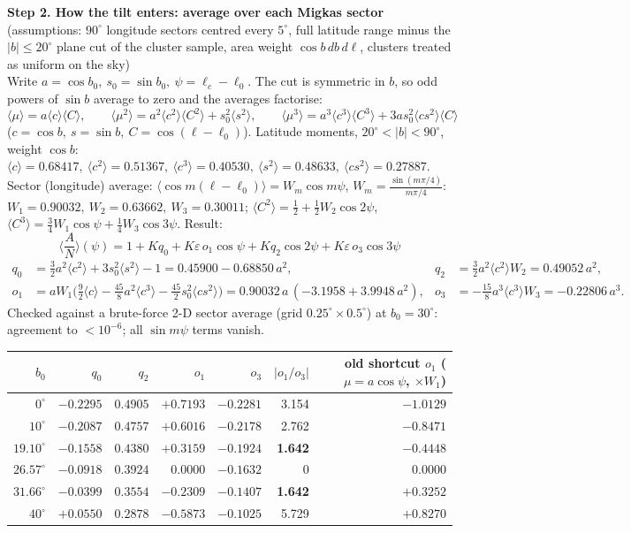 \documentclass[11pt]{article}
\begin{document}
\medskip\textbf{Step 2. How the tilt enters: average over each Migkas sector} (assumptions: $90^\circ$ longitude sectors centred every $5^\circ$,
full latitude range minus the $|b|\le20^\circ$ plane cut of the cluster sample, area weight $\cos b\,db\,d\ell$, clusters treated as uniform on the sky)\\[2pt]
Write $a=\cos b_0,\ s_0=\sin b_0,\ \psi=\ell_c-\ell_0$. The cut is symmetric in $b$, so odd powers of $\sin b$ average to zero and the averages factorise:
\[
\langle\mu\rangle=a\langle c\rangle\langle C\rangle,\qquad
\langle\mu^2\rangle=a^2\langle c^2\rangle\langle C^2\rangle+s_0^2\langle s^2\rangle,\qquad
\langle\mu^3\rangle=a^3\langle c^3\rangle\langle C^3\rangle+3as_0^2\langle cs^2\rangle\langle C\rangle
\]
($c=\cos b,\ s=\sin b,\ C=\cos(\ell-\ell_0)$). Latitude moments, $20^\circ<|b|<90^\circ$, weight $\cos b$:\\
$\langle c\rangle=0.68417,\ \langle c^2\rangle=0.51367,\ \langle c^3\rangle=0.40530,\ \langle s^2\rangle=0.48633,\ \langle cs^2\rangle=0.27887$.\\
Sector (longitude) average: $\langle\cos m(\ell-\ell_0)\rangle=W_m\cos m\psi$, $W_m=\frac{\sin(m\pi/4)}{m\pi/4}$:\\
$W_1=0.90032,\ W_2=0.63662,\ W_3=0.30011$;\quad
$\langle C^2\rangle=\tfrac12+\tfrac12W_2\cos2\psi$, \ $\langle C^3\rangle=\tfrac34W_1\cos\psi+\tfrac14W_3\cos3\psi$. Result:
\[
\Big\langle\frac{A}{N}\Big\rangle(\psi)=1+Kq_0+K\varepsilon\,o_1\cos\psi+Kq_2\cos2\psi+K\varepsilon\,o_3\cos3\psi
\]
\begin{align*}
q_0&=\tfrac32a^2\langle c^2\rangle+3s_0^2\langle s^2\rangle-1=0.45900-0.68850\,a^2, &
q_2&=\tfrac32a^2\langle c^2\rangle W_2=0.49052\,a^2,\\
o_1&=aW_1\big(\tfrac92\langle c\rangle-\tfrac{45}{8}a^2\langle c^3\rangle-\tfrac{45}{2}s_0^2\langle cs^2\rangle\big)=0.90032\,a\,(-3.1958+3.9948\,a^2), &
o_3&=-\tfrac{15}{8}a^3\langle c^3\rangle W_3=-0.22806\,a^3.
\end{align*}
Checked against a brute-force 2-D sector average (grid $0.25^\circ\times0.5^\circ$) at $b_0=30^\circ$: agreement to $<10^{-6}$; all $\sin m\psi$ terms vanish.
\begin{center}\small
\begin{tabular}{r|rrrr|r|r}
$b_0$ & $q_0$ & $q_2$ & $o_1$ & $o_3$ & $|o_1/o_3|$ & old shortcut $o_1$ ($\mu=a\cos\psi$, $\times W_1$)\\\hline
$0^\circ$ & $-0.2295$ & $0.4905$ & $+0.7193$ & $-0.2281$ & 3.154 & $-1.0129$\\
$10^\circ$ & $-0.2087$ & $0.4757$ & $+0.6016$ & $-0.2178$ & 2.762 & $-0.8471$\\
$\mathbf{19.10^\circ}$ & $-0.1558$ & $0.4380$ & $+0.3159$ & $-0.1924$ & \textbf{1.642} & $-0.4448$\\
$26.57^\circ$ & $-0.0918$ & $0.3924$ & $0.0000$ & $-0.1632$ & 0 & $0.0000$\\
$\mathbf{31.66^\circ}$ & $-0.0399$ & $0.3554$ & $-0.2309$ & $-0.1407$ & \textbf{1.642} & $+0.3252$\\
$40^\circ$ & $+0.0550$ & $0.2878$ & $-0.5873$ & $-0.1025$ & 5.729 & $+0.8270$
\end{tabular}\end{center}
\end{document}
